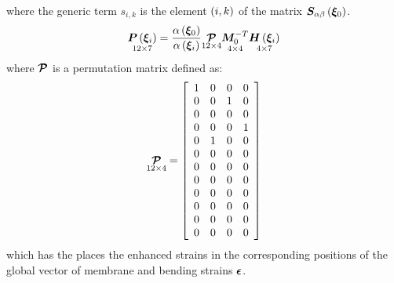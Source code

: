 where the generic term $s_{ i, k }$ is the element $\plbr{i,k}$ of the matrix $\TT{S}_{ \alpha \beta } \valxio$.\\
\begin{equation}
\underset{ 12 \times 7 }{ \TT{P} \valxii } =
\fracd{ \alpha \valxio }{ \alpha \valxii } \underset{ 12 \times 4  }{ \T{\mathcal{P}} } \underset{ 4 \times 4 }{ \TT{M}_{0}^{-T} } \underset{ 4 \times 7 }{ \TT{H} \valxii }
\end{equation}
where $\T{\mathcal{P}}$ is a permutation matrix defined as:
\begin{equation}
\underset{ 12 \times 4 }{ \T{\mathcal{P}} } =
\sqbr{ \matr{ c c c c  }{
1 & 0 & 0 & 0 \\
0 & 0 & 1 & 0 \\
0 & 0 & 0 & 0 \\
0 & 0 & 0 & 1 \\
0 & 1 & 0 & 0 \\
0 & 0 & 0 & 0 \\
0 & 0 & 0 & 0 \\
0 & 0 & 0 & 0 \\
0 & 0 & 0 & 0 \\
0 & 0 & 0 & 0 \\
0 & 0 & 0 & 0 \\
0 & 0 & 0 & 0
}}
\end{equation}
which has the places the enhanced strains in the corresponding positions of the global vector of membrane and bending strains $\T{\epsilon}$.
